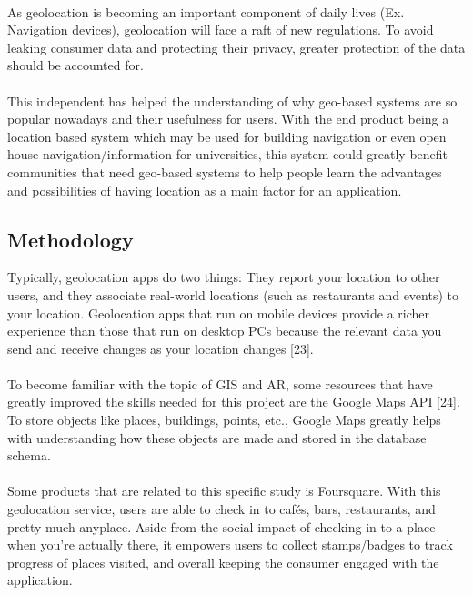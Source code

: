 \paragraph{} As geolocation is becoming an important component of daily lives (Ex. Navigation devices), geolocation will face a raft of new regulations. To avoid leaking consumer data and protecting their privacy, greater protection of the data should be accounted for.
\paragraph{} This independent has helped the understanding of why geo-based systems are so popular nowadays and their usefulness for users. With the end product being a location based system which may be used for building navigation or even open house navigation/information for universities, this system could greatly benefit communities that need geo-based systems to help people learn the advantages and possibilities of having location as a main factor for an application.
\subsection{Methodology}
Typically, geolocation apps do two things: They report your location to other users, and they associate real-world locations (such as restaurants and events) to your location. Geolocation apps that run on mobile devices provide a richer experience than those that run on desktop PCs because the relevant data you send and receive changes as your location changes [23].
\paragraph{} To become familiar with the topic of GIS and AR, some resources that have greatly improved the skills needed for this project are the Google Maps API [24]. To store objects like places, buildings, points, etc., Google Maps greatly helps with understanding how these objects are made and stored in the database schema.
\paragraph{} Some products that are related to this specific study is Foursquare. With this geolocation service, users are able to check in to cafés, bars, restaurants, and pretty much anyplace. Aside from the social impact of checking in to a place when you’re actually there, it empowers users to collect stamps/badges to track progress of places visited, and overall keeping the consumer engaged with the application.
